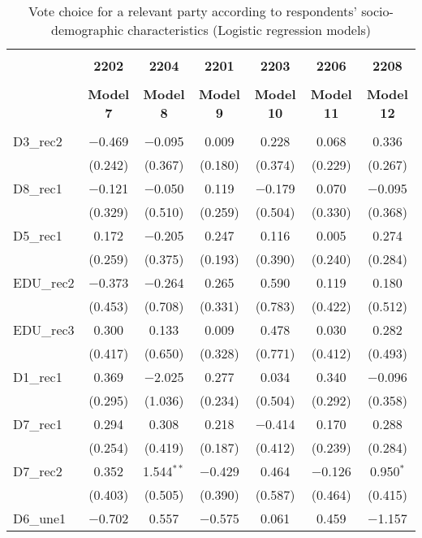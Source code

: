 \documentclass[
]{article}
\begin{document}
\begin{table}[!htbp] \centering 
  \caption{Vote choice for a relevant party according to respondents' 
                       socio-demographic characteristics (Logistic regression models)} 
  \label{table:full_logit_pt} 
\begin{tabular}{@{\extracolsep{5pt}}lcccccc} 
\\[-1.8ex]\hline \\[-1.8ex] 
 & \textbf{2202} & \textbf{2204} & \textbf{2201} & \textbf{2203} & \textbf{2206} & \textbf{2208} \\ 
\\[-1.8ex] & \textbf{Model 7} & \textbf{Model 8} & \textbf{Model 9} & \textbf{Model 10} & \textbf{Model 11} & \textbf{Model 12}\\ 
\hline \\[-1.8ex] 
 D3\_rec2 & $-$0.469 & $-$0.095 & 0.009 & 0.228 & 0.068 & 0.336 \\ 
  & (0.242) & (0.367) & (0.180) & (0.374) & (0.229) & (0.267) \\ 
  D8\_rec1 & $-$0.121 & $-$0.050 & 0.119 & $-$0.179 & 0.070 & $-$0.095 \\ 
  & (0.329) & (0.510) & (0.259) & (0.504) & (0.330) & (0.368) \\ 
  D5\_rec1 & 0.172 & $-$0.205 & 0.247 & 0.116 & 0.005 & 0.274 \\ 
  & (0.259) & (0.375) & (0.193) & (0.390) & (0.240) & (0.284) \\ 
  EDU\_rec2 & $-$0.373 & $-$0.264 & 0.265 & 0.590 & 0.119 & 0.180 \\ 
  & (0.453) & (0.708) & (0.331) & (0.783) & (0.422) & (0.512) \\ 
  EDU\_rec3 & 0.300 & 0.133 & 0.009 & 0.478 & 0.030 & 0.282 \\ 
  & (0.417) & (0.650) & (0.328) & (0.771) & (0.412) & (0.493) \\ 
  D1\_rec1 & 0.369 & $-$2.025 & 0.277 & 0.034 & 0.340 & $-$0.096 \\ 
  & (0.295) & (1.036) & (0.234) & (0.504) & (0.292) & (0.358) \\ 
  D7\_rec1 & 0.294 & 0.308 & 0.218 & $-$0.414 & 0.170 & 0.288 \\ 
  & (0.254) & (0.419) & (0.187) & (0.412) & (0.239) & (0.284) \\ 
  D7\_rec2 & 0.352 & 1.544$^{**}$ & $-$0.429 & 0.464 & $-$0.126 & 0.950$^{*}$ \\ 
  & (0.403) & (0.505) & (0.390) & (0.587) & (0.464) & (0.415) \\ 
  D6\_une1 & $-$0.702 & 0.557 & $-$0.575 & 0.061 & 0.459 & $-$1.157 \\ 

\end{tabular}
\end{table}
\end{document}
